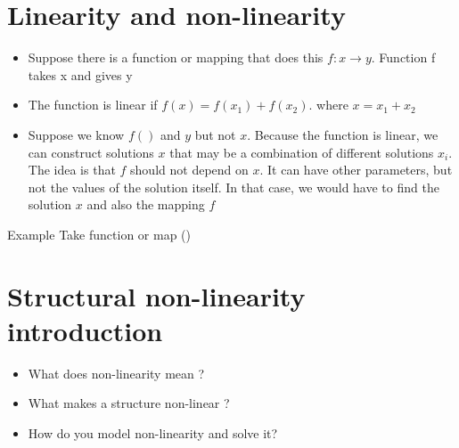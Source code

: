 \section{Linearity and non-linearity}
	\begin{frame}
		\begin{itemize}
			\item Suppose there is a function or mapping that does this $f : x \rightarrow y$. Function f takes x and gives y
			
			\item The function is linear if $f(x) = f(x_1) + f(x_2)$. where $x = x_1 + x_2$
			
			\item Suppose we know $f()$ and $y$ but not $x$. Because the function is linear, we can construct solutions $x$ that may be a combination of different solutions $x_i$. The idea is that $f$ should not depend on $x$. It can have other parameters, but not the values of the solution itself. In that case, we would have to find the solution $x$ and also the mapping $f$
			
		\end{itemize}
	
		\begin{block}{Example}
			Take function or map () 
		\end{block}
	\end{frame}




\section{Structural non-linearity introduction}
	\begin{frame}
		\begin{itemize}
			\item What does non-linearity mean ?
			\item What makes a structure non-linear ?
			\item How do you model non-linearity and solve it?
		\end{itemize}
	\end{frame}
	
